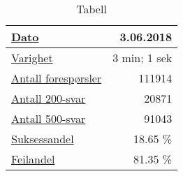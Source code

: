 \begin{table}[hbtp]
  \begin{center}
    \begin{tabular}{ | l | r |}
      \hline
      \underline{Dato} & 3.06.2018 \\ \hline
      \underline{Varighet} & 3 min; 1 sek \\ \hline
      \underline{Antall forespørsler} & 111914 \\ \hline
      \underline{Antall 200-svar} & 20871 \\ \hline
      \underline{Antall 500-svar} & 91043 \\ \hline
      \underline{Suksessandel} & 18.65 \% \\ \hline
      \underline{Feilandel} & 81.35 \% \\ \hline
    \end{tabular}
  \end{center}
  \caption{Tabell}
  \label{frontend2}
\end{table}
